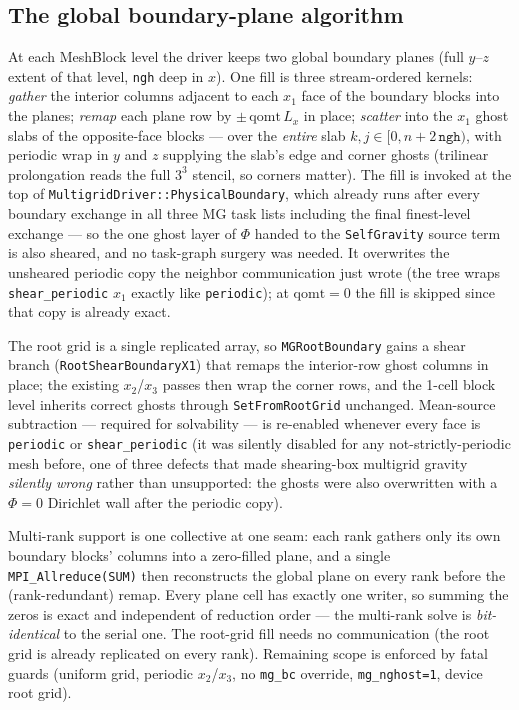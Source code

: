 \documentclass[11pt]{article}
\newcommand{\code}[1]{\texttt{#1}}
\begin{document}
\subsection{The global boundary-plane algorithm}
\label{sec:p1_algo}
At each MeshBlock level the driver keeps two global boundary planes (full $y$--$z$
extent of that level, \code{ngh} deep in $x$). One fill is three stream-ordered
kernels: \emph{gather} the interior columns adjacent to each $x_1$ face of the
boundary blocks into the planes; \emph{remap} each plane row by $\pm\,\mathrm{qomt}
\,L_x$ in place; \emph{scatter} into the $x_1$ ghost slabs of the opposite-face
blocks --- over the \emph{entire} slab $k,j \in [0, n{+}2\,\code{ngh})$, with
periodic wrap in $y$ and $z$ supplying the slab's edge and corner ghosts (trilinear
prolongation reads the full $3^3$ stencil, so corners matter). The fill is invoked
at the top of \code{MultigridDriver::PhysicalBoundary}, which already runs after
every boundary exchange in all three MG task lists including the final
finest-level exchange --- so the one ghost layer of $\Phi$ handed to the
\code{SelfGravity} source term is also sheared, and no task-graph surgery was
needed. It overwrites the unsheared periodic copy the neighbor communication just
wrote (the tree wraps \code{shear\_periodic} $x_1$ exactly like \code{periodic});
at $\mathrm{qomt}=0$ the fill is skipped since that copy is already exact.

The root grid is a single replicated array, so \code{MGRootBoundary} gains a shear
branch (\code{RootShearBoundaryX1}) that remaps the interior-row ghost columns in
place; the existing $x_2$/$x_3$ passes then wrap the corner rows, and the 1-cell
block level inherits correct ghosts through \code{SetFromRootGrid} unchanged.
Mean-source subtraction --- required for solvability --- is re-enabled whenever
every face is \code{periodic} or \code{shear\_periodic} (it was silently disabled
for any not-strictly-periodic mesh before, one of three defects that made
shearing-box multigrid gravity \emph{silently wrong} rather than unsupported: the
ghosts were also overwritten with a $\Phi = 0$ Dirichlet wall after the periodic
copy).

Multi-rank support is one collective at one seam: each rank gathers only its own
boundary blocks' columns into a zero-filled plane, and a single
\code{MPI\_Allreduce(SUM)} then reconstructs the global plane on every rank before
the (rank-redundant) remap. Every plane cell has exactly one writer, so summing the
zeros is exact and independent of reduction order --- the multi-rank solve is
\emph{bit-identical} to the serial one. The root-grid fill needs no communication
(the root grid is already replicated on every rank). Remaining scope is enforced by
fatal guards (uniform grid, periodic $x_2$/$x_3$, no \code{mg\_bc} override,
\code{mg\_nghost=1}, device root grid).
\end{document}
